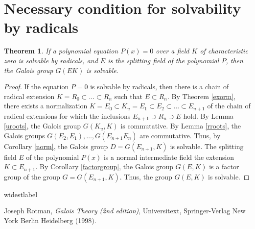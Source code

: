 \documentclass[11pt]{article}
\theoremstyle{plain}
\newtheorem{theorem}{Theorem}[section]
\theoremstyle{definition}
\begin{document}
 \section{Necessary condition for solvability by radicals}

\begin{theorem} If a polynomial equation $P(x)=0$ over a field $K$ of characteristic zero is solvable by radicals, and   $E$ is the splitting field of the polynomial $P$, then the Galois group $G(EK)$ is solvable.
\end{theorem}

\begin{proof} If the equation $P=0$ is solvable by radicals, then there is a chain of radical extension $K=R_0\subset\dots\subset R_n$ such that $E\subset R_n$.
By Theorem \ref{exorm}, there exists a normalization $K=E_0\subset K_u=E_1\subset E_2\subset \ldots\subset E_{n+1}$ of the chain of radical extensions for which the inclusions $E_{n+1}\supset R_n\supset E$ hold.  By Lemma \ref{uroots}, the Galois group $G (K_u,K)$ is commutative. By Lemma \ref{rroots}, the Galois groups $G(E_2,E_1),\dots, G(E_{n+1}E_n)$ are commutative. Thus, by  Corollary \ref{norm},  the Galois group  $D=G(E_{n+1},K)$ is solvable.
The splitting field $E$ of the polynomial $P(x)$ is a normal intermediate field  the extension $K\subset E_{n+1}$. By Corollary \ref{factorgroup},  the Galois group $G(E,K)$ is a factor group of the group $G=G(E_{n+1},K)$. Thus, the group $G(E,K)$ is solvable.

 \end{proof}

\begin{thebibliography}{widestlabel}

  Joseph Rotman, {\it Galois Theory (2nd edition)}, Universitext, Springer-Verlag New York Berlin Heidelberg (1998).
 \end{thebibliography}
\end{document}
